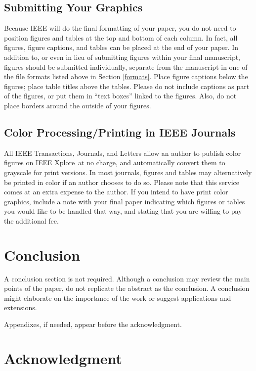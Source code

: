 \documentclass{IEEEtran}
\begin{document}
\subsection{Submitting Your Graphics}
Because IEEE will do the final formatting of your paper,
you do not need to position figures and tables at the top and bottom of each 
column. In fact, all figures, figure captions, and tables can be placed at 
the end of your paper. In addition to, or even in lieu of submitting figures 
within your final manuscript, figures should be submitted individually, 
separate from the manuscript in one of the file formats listed above in 
Section \ref{formats}. Place figure captions below the figures; place table titles 
above the tables. Please do not include captions as part of the figures, or 
put them in ``text boxes'' linked to the figures. Also, do not place borders 
around the outside of your figures.

\subsection{Color Processing/Printing in IEEE Journals}
All IEEE Transactions, Journals, and Letters allow an author to publish 
color figures on IEEE Xplore\textregistered\ at no charge, and automatically 
convert them to grayscale for print versions. In most journals, figures and 
tables may alternatively be printed in color if an author chooses to do so. 
Please note that this service comes at an extra expense to the author. If 
you intend to have print color graphics, include a note with your final 
paper indicating which figures or tables you would like to be handled that 
way, and stating that you are willing to pay the additional fee.

\section{Conclusion}
A conclusion section is not required. Although a conclusion may review the 
main points of the paper, do not replicate the abstract as the conclusion. A 
conclusion might elaborate on the importance of the work or suggest 
applications and extensions. 

\appendices

Appendixes, if needed, appear before the acknowledgment.

\section*{Acknowledgment}
\end{document}
